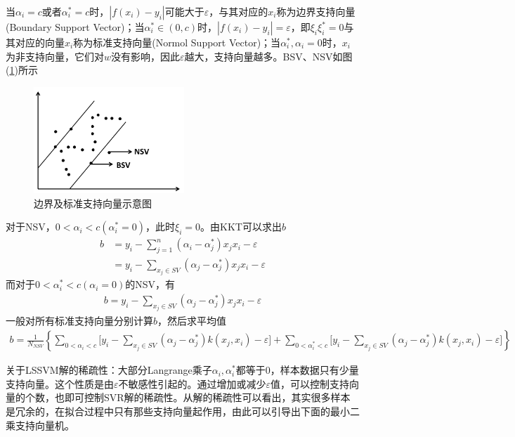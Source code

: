     当$\alpha_i = c$或者$\alpha_i^* = c$时，$|f(x_i) - y_i|$可能大于$\varepsilon$，与其对应的$x_i$称为边界支持向量(Boundary Support Vector)；当$\alpha_i^*\in (0,c)$时，$|f(x_i) - y_i| = \varepsilon$，即$\xi_i\xi_i^* = 0$与其对应的向量$x_i$称为标准支持向量(Normol Support Vector)；当$\alpha_i^*,\alpha_i=0$时，$x_i$为非支持向量，它们对$w$没有影响，因此$\varepsilon$越大，支持向量越多。BSV、NSV如图(\ref{边界及标准支持向量示意图})所示
            \begin{figure}[H]
            \centering
            \includegraphics[height=4cm]{images/Boundary_and_Standard_Support_Vector.jpg}
            \caption{边界及标准支持向量示意图}
            \label{边界及标准支持向量示意图}
            \end{figure}
    \par
    对于NSV，$0<\alpha_i<c(\alpha_i^* = 0)$，此时$\xi_i=0$。由KKT可以求出$b$
    \begin{align*}
    b & = y_i - \sum_{j=1}^n(\alpha_i-\alpha_j^*)x_jx_i - \varepsilon\\
    & =y_i - \sum_{x_j\in SV}(\alpha_j - \alpha_j^*) x_jx_i -\varepsilon
    \end{align*}
    而对于$0<\alpha_i^*<c(\alpha_i=0)$的NSV，有
    \begin{align*}
    b = y_i - \sum_{x_j\in SV}(\alpha_j - \alpha_j^*) x_jx_i -\varepsilon
    \end{align*}
    一般对所有标准支持向量分别计算$b$，然后求平均值
    \begin{align*}
    b=\frac{1}{N_{NSV}} \left\{ \sum_{0<\alpha_i<c} \Big[ y_i - \sum_{x_j\in SV}(\alpha_j - \alpha_j^*)k(x_j,x_i)-\varepsilon\Big] + \sum_{0<\alpha_i^*<c} \Big[ y_i - \sum_{x_j\in SV}(\alpha_j - \alpha_j^*)k(x_j,x_i)-\varepsilon\Big] \right\}
    \end{align*}
    \par
    关于LSSVM解的稀疏性：大部分Langrange乘子$\alpha_i,\alpha_i^*$都等于0，样本数据只有少量支持向量。这个性质是由$\varepsilon$不敏感性引起的。通过增加或减少$\varepsilon$值，可以控制支持向量的个数，也即可控制SVR解的稀疏性。从解的稀疏性可以看出，其实很多样本是冗余的，在拟合过程中只有那些支持向量起作用，由此可以引导出下面的最小二乘支持向量机。
